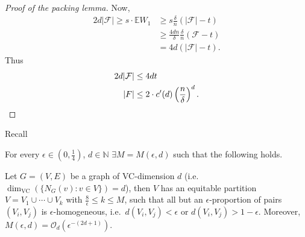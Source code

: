 \documentclass{article}
\begin{document}
\begin{proof}[Proof of the packing lemma]
  Now,
  \begin{align*}
    2 d|\mathcal{F}| \geq s \cdot \mathbb{E}W_1 &\geq s \frac{\delta}{n} (|\mathcal{F}|-t) \\
                                                &\geq \frac{4dn}{\delta} \frac{\delta}{n} (\mathcal{F}-t) \\
                                                &= 4d (|\mathcal{F}| - t).
  \end{align*}
  Thus
  \begin{align*}
    2d |\mathcal{F}| &\leq 4dt \\
    |F| &\leq 2 \cdot c'(d) \left(\frac{n}{\delta}\right)^d. \qedhere
  \end{align*}
\end{proof}

\newlec
Recall
\begin{thm}
  For every $\epsilon \in (0, \frac{1}{4})$, $d \in \mathbb{N}$ $\exists M = M(\epsilon,d)$ such that the following holds.

  Let $G = (V,E)$ be a graph of VC-dimension $d$ (i.e.\ $\dim_{\text{VC}}(\{N_G(v):v \in V\})=d$), then $V$ has an equitable partition $V = V_1 \cup \dotsb \cup V_k$ with $\frac{8}{\epsilon} \leq k \leq M$, such that all but an $\epsilon$-proportion of pairs $(V_i,V_j)$ is $\epsilon$-homogeneous, i.e.\ $d(V_i, V_j) < \epsilon$ or $d(V_i, V_j) > 1-\epsilon$. Moreover, $M(\epsilon,d) = \mathcal{O}_d(\epsilon^{-(2d+1)})$.
\end{thm}
\end{document}
